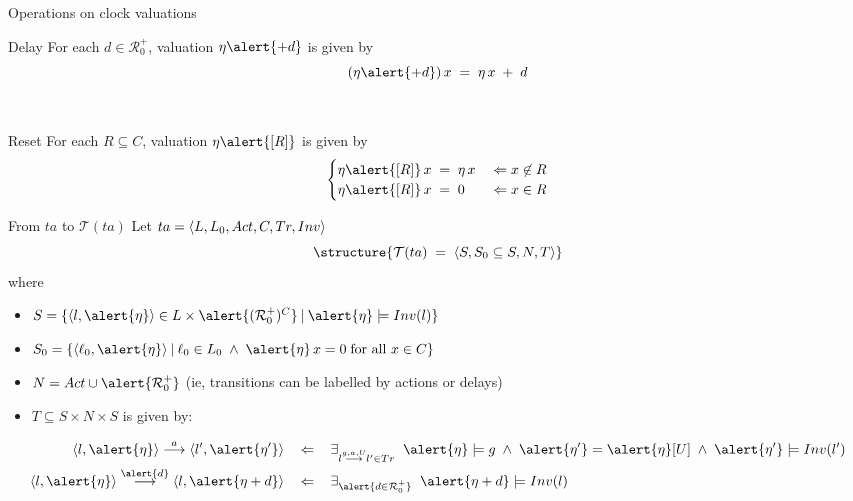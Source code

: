 \documentclass[aspectratio=169]{beamer}
\def\R{\mathcal{R}}
\def\TL#1{\mathcal{T}(#1)}
\begin{document}
\begin{slide}{Operations on clock valuations}
\small


\begin{block}{Delay}
For each $d \in \R_0^+$, valuation $\eta \alert{+ d}$ is given by
\begin{equation*}
(\eta \alert{+ d})\, x\; =\; \eta\, x\; +\; d
\end{equation*}
\end{block}
~\\

\begin{block}{Reset}
For each $R \subseteq C$, valuation $\eta\alert{[R]}$ is given by
\begin{equation*}
\begin{cases}
\eta\alert{[R]}\, x\; =\; \eta\, x & \; \rimp\; x \not\in R\\
\eta\alert{[R]}\, x\; =\; 0 & \; \rimp\; x \in R
\end{cases}
\end{equation*}
\end{block}
\end{slide}

\begin{slide}{From $ta$ to $\TL{ta}$}
\small
Let $ta = \mathopen{\langle}L, L_0, Act, C, Tr, Inv\mathclose{\rangle}$
\begin{equation*}
 \structure{\TL{ta}\; =\; \pair{S, S_0 \subseteq S, N, T}}
\end{equation*}
where
\begin{itemize}
\item $S = \setdef{\pair{l,\alert{\eta}} \in  L \times \alert{(\R_0^+)^C}}{\alert{\eta} \models Inv(l)}$
\item $S_0 = \setdef{\pair{\ell_0,\alert{\eta}}}{\ell_0 \in L_0\; \e\;  \alert{\eta}\, x = 0\; \text{for all $x \in C$}}$
\item $N = Act \cup \alert{\R_0^+}$ (ie, \alert{transitions can be labelled by actions or delays})
\item $T \subseteq S \times N \times S$ is given by:
\end{itemize}
\begin{align*}
\pair{l,\alert{\eta}} \tran{a} \pair{l',\alert{\eta'}}\; & ~~\rimp~~\; 
\exists_{l \tran{g,a,U} l' \in Tr}  \; \;\alert{\eta} \models g \; \e\; \alert{\eta'} = \alert{\eta}[U] \; \e\;  \alert{\eta'} \models Inv(l')\\
\pair{l,\alert{\eta}} \tran{\alert{d}} \pair{l,\alert{\eta +d}}\; & ~~\rimp~~\; 
\exists_{\alert{d \in \R_0^+}}  \; \;  \alert{\eta + d} \models Inv(l)
\end{align*}
\end{slide}
\end{document}
